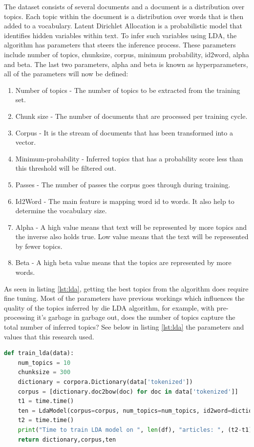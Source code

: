 The dataset consists of several documents and a document is a distribution over topics. Each topic within the document is a distribution over words that is then added to a vocabulary. Latent Dirichlet Allocation is a probabilistic model that identifies hidden variables within text. To infer such variables using LDA, the algorithm has parameters that steers the inference process. These parameters include number of topics, chunksize, corpus, minimum probability, id2word, alpha and beta. The last two parameters, alpha and beta is known as hyperparameters, all of the parameters will now be defined:
\begin{enumerate}
    \item Number of topics - The number of topics to be extracted from the training set.
    \item Chunk size - The number of documents that are processed per training cycle.
    \item Corpus - It is the stream of documents that has been transformed into a vector.
    \item Minimum-probability - Inferred topics that has a probability score less than this threshold will be filtered out.
    \item Passes - The number of passes the corpus goes through during training.
    \item Id2Word - The main feature is mapping word id to words. It also help to determine the vocabulary size.
    \item Alpha - A high value means that text will be represented by more topics and the inverse also holds true. Low value means that the text will be represented by fewer topics.
    \item Beta - A high beta value means that the topics are represented by more words.
   
\end{enumerate}
As seen in listing \ref{lst:lda}, getting the best topics from the algorithm does require fine tuning. Most of the parameters have previous workings which influences the quality of the topics inferred by die LDA algorithm, for example, with pre-processing it's garbage in garbage out, does the number of topics capture the total number of inferred topics? See below in listing \ref{lst:lda} the parameters and values that this research used.
\begin{lstlisting}[language=Python, label={lst:lda}, caption=LDA Parameters]
def train_lda(data):
    num_topics = 10
    chunksize = 300
    dictionary = corpora.Dictionary(data['tokenized'])
    corpus = [dictionary.doc2bow(doc) for doc in data['tokenized']]
    t1 = time.time()
    ten = LdaModel(corpus=corpus, num_topics=num_topics, id2word=dictionary, chunksize=chunksize, minimum_probability=0.0,iterations=100)
    t2 = time.time()
    print("Time to train LDA model on ", len(df), "articles: ", (t2-t1)/60, "min")
    return dictionary,corpus,ten
\end{lstlisting}
